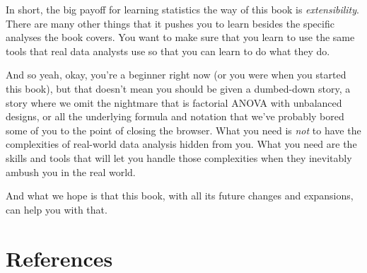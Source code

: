 \documentclass[
]{book}
\theoremstyle{definition}
\theoremstyle{definition}
\theoremstyle{definition}
\theoremstyle{definition}
\theoremstyle{remark}
\begin{document}
In short, the big payoff for learning statistics the way of this book is \emph{extensibility}. There are many other things that it pushes you to learn besides the specific analyses the book covers. You want to make sure that you learn to use the same tools that real data analysts use so that you can learn to do what they do.

And so yeah, okay, you're a beginner right now (or you were when you started this book), but that doesn't mean you should be given a dumbed-down story, a story where we omit the nightmare that is factorial ANOVA with unbalanced designs, or all the underlying formula and notation that we've probably bored some of you to the point of closing the browser. What you need is \emph{not} to have the complexities of real-world data analysis hidden from you. What you need are the skills and tools that will let you handle those complexities when they inevitably ambush you in the real world.

And what we hope is that this book, with all its future changes and expansions, can help you with that.

\hypertarget{references}{%
\chapter*{References}\label{references}}
\end{document}
